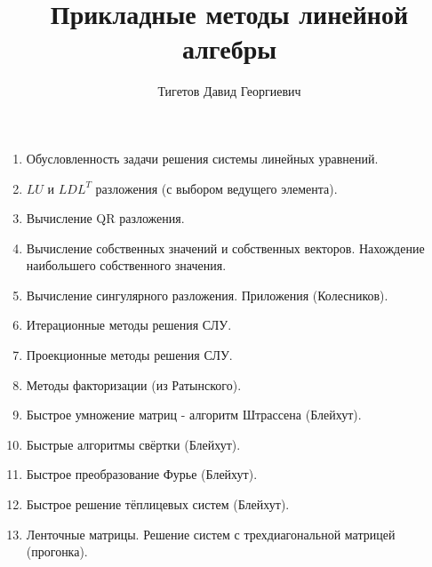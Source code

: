 \documentclass[a4paper,12pt]{book}
\begin{document}
    \title{Прикладные методы линейной алгебры}
    \author{Тигетов Давид Георгиевич}
    \maketitle

    \tableofcontents

    

    

    

    

    

    

    
%    
%    
%    
%    
%    

    

    

    \begin{enumerate}
        \item Обусловленность задачи решения системы линейных уравнений.
        \item $LU$ и $LDL^T$ разложения (с выбором ведущего элемента).
        \item Вычисление QR разложения.
        \item Вычисление собственных значений и собственных векторов. Нахождение наибольшего собственного значения.
        \item Вычисление сингулярного разложения. Приложения (Колесников).
        \item Итерационные методы решения СЛУ.
        \item Проекционные методы решения СЛУ.
        \item Методы факторизации (из Ратынского).
        \item Быстрое умножение матриц - алгоритм Штрассена (Блейхут).
        \item Быстрые алгоритмы свёртки (Блейхут).
        \item Быстрое преобразование Фурье (Блейхут).
        \item Быстрое решение тёплицевых систем (Блейхут).
        \item Ленточные матрицы. Решение систем с трехдиагональной матрицей (прогонка).
    \end{enumerate}
\end{document}
